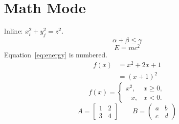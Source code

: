 \documentclass{article}
\begin{document}
\section*{Math Mode}
Inline: \(x_i^2 + y_j^2 = z^2\).
\[
\alpha + \beta \leq \gamma
\]
\begin{equation}
E = mc^2
\label{eq:energy}
\end{equation}
Equation~\ref{eq:energy} is numbered.
\begin{align}
f(x) &= x^2+2x+1 \\
     &= (x+1)^2
\end{align}
\[
f(x)=\begin{cases}
x^2, & x\geq 0,\\
-x, & x<0.
\end{cases}
\]
\[
A=\begin{bmatrix}1&2\\3&4\end{bmatrix}
\qquad
B=\begin{pmatrix}a&b\\c&d\end{pmatrix}
\]
\end{document}
